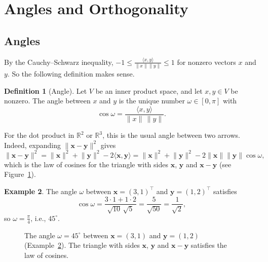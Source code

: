 \documentclass[11pt]{article}
\newcommand{\norm}[1]{\lVert #1 \rVert}
\newcommand{\ip}[2]{\langle #1, #2 \rangle}
\theoremstyle{definition}
\newtheorem{definition}{Definition}[section]
\newtheorem{example}[definition]{Example}
\theoremstyle{plain}
\theoremstyle{remark}
\begin{document}
\section{Angles and Orthogonality}

\subsection{Angles}

By the Cauchy--Schwarz inequality, $-1 \leq \frac{\ip{x}{y}}{\norm{x} \norm{y}} \leq 1$ for nonzero vectors $x$ and $y$. So the following definition makes sense.

\begin{definition}[Angle]
    Let $V$ be an inner product space, and let $x, y \in V$ be nonzero. The angle between $x$ and $y$ is the unique number $\omega \in [0, \pi]$ with
    \[\cos \omega = \frac{\ip{x}{y}}{\norm{x} \, \norm{y}}.\]
\end{definition}

For the dot product in $\mathbb{R}^2$ or $\mathbb{R}^3$, this is the usual angle between two arrows. Indeed, expanding $\norm{\mathbf{x} - \mathbf{y}}^2$ gives
\[\norm{\mathbf{x} - \mathbf{y}}^2 = \norm{\mathbf{x}}^2 + \norm{\mathbf{y}}^2 - 2 \ip{\mathbf{x}}{\mathbf{y}} = \norm{\mathbf{x}}^2 + \norm{\mathbf{y}}^2 - 2 \norm{\mathbf{x}} \norm{\mathbf{y}} \cos\omega,\]
which is the law of cosines for the triangle with sides $\mathbf{x}$, $\mathbf{y}$ and $\mathbf{x} - \mathbf{y}$ (see Figure~\ref{fig:angle}).

\begin{example}\label{ex:angle}
    The angle $\omega$ between $\mathbf{x} = (3, 1)^\top$ and $\mathbf{y} = (1, 2)^\top$ satisfies
    \[\cos\omega = \frac{3 \cdot 1 + 1 \cdot 2}{\sqrt{10} \, \sqrt{5}} = \frac{5}{\sqrt{50}} = \frac{1}{\sqrt{2}},\]
    so $\omega = \frac{\pi}{4}$, i.e., $45^\circ$.
\end{example}

\begin{figure}[ht]
    \centering
    \caption[The angle between two vectors]{The angle $\omega = 45^\circ$ between $\mathbf{x} = (3, 1)$ and $\mathbf{y} = (1, 2)$ (Example~\ref{ex:angle}). The triangle with sides $\mathbf{x}$, $\mathbf{y}$ and $\mathbf{x} - \mathbf{y}$ satisfies the law of cosines.}
    \label{fig:angle}
\end{figure}
\end{document}
